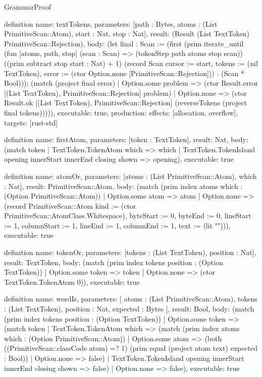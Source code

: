 \begin{lexlean}{GrammarProof}
\begin{semanticmodule}
definition{
  name: textTokens,
  parameters: [path : Bytes, atoms : (List PrimitiveScan::Atom), start : Nat, stop : Nat],
  result: (Result (List TextToken) PrimitiveScan::Rejection),
  body: (let final : Scan := (first (prim iterate_until (fun [atoms, path, stop] (scan : Scan) => (tokenStep path atoms stop scan)) ((prim subtract stop start : Nat) + 1) (record Scan {cursor := start, tokens := (nil TextToken), error := (ctor Option.none [PrimitiveScan::Rejection])}) : (Scan * Bool))); (match (project final error)
    | Option.some problem => (ctor Result.error [(List TextToken), PrimitiveScan::Rejection] problem)
    | Option.none => (ctor Result.ok [(List TextToken), PrimitiveScan::Rejection] (reverseTokens (project final tokens))))),
  executable: true,
  production: {effects: [allocation, overflow], targets: [rust-std]}
}

definition{
  name: firstAtom,
  parameters: [token : TextToken],
  result: Nat,
  body: (match token
    | TextToken.TokenAtom which => which
    | TextToken.TokenIsland opening innerStart innerEnd closing shown => opening),
  executable: true
}

definition{
  name: atomOr,
  parameters: [atoms : (List PrimitiveScan::Atom), which : Nat],
  result: PrimitiveScan::Atom,
  body: (match (prim index atoms which : (Option PrimitiveScan::Atom))
    | Option.some atom => atom
    | Option.none => (record PrimitiveScan::Atom {kind := (ctor PrimitiveScan::AtomClass.Whitespace), byteStart := 0, byteEnd := 0, lineStart := 1, columnStart := 1, lineEnd := 1, columnEnd := 1, text := (lit "")})),
  executable: true
}

definition{
  name: tokenOr,
  parameters: [tokens : (List TextToken), position : Nat],
  result: TextToken,
  body: (match (prim index tokens position : (Option TextToken))
    | Option.some token => token
    | Option.none => (ctor TextToken.TokenAtom 0)),
  executable: true
}

definition{
  name: wordIs,
  parameters: [
    atoms : (List PrimitiveScan::Atom),
    tokens : (List TextToken),
    position : Nat,
    expected : Bytes
  ],
  result: Bool,
  body: (match (prim index tokens position : (Option TextToken))
    | Option.some token => (match token
      | TextToken.TokenAtom which => (match (prim index atoms which : (Option PrimitiveScan::Atom))
        | Option.some atom => (both ((PrimitiveScan::classCode atom) =? 1) (prim equal (project atom text) expected : Bool))
        | Option.none => false)
      | TextToken.TokenIsland opening innerStart innerEnd closing shown => false)
    | Option.none => false),
  executable: true
}


\end{semanticmodule}
\end{lexlean}
